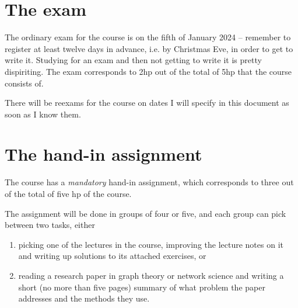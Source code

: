 \documentclass{tufte-handout}
\begin{document}
\section{The exam}

The ordinary exam for the course is on the fifth of January 2024 -- remember to register at least twelve days in advance, i.e. by Christmas Eve, in order to get to write it. Studying for an exam and then not getting to write it is pretty dispiriting. The exam corresponds to 2hp out of the total of 5hp that the course consists of.

There will be reexams for the course on dates I will specify in this document as soon as I know them.

\section{The hand-in assignment}

The course has a \emph{mandatory} hand-in assignment, which corresponds to three out of the total of five hp of the course.

The assignment will be done in groups of four or five, and each group can pick between two tasks, either
\begin{enumerate}
  \item picking one of the lectures in the course, improving the lecture notes on it and writing up solutions to its attached exercises, or
  \item reading a research paper in graph theory or network science and writing a short (no more than five pages) summary of what problem the paper addresses and the methods they use.
\end{enumerate}
\end{document}
